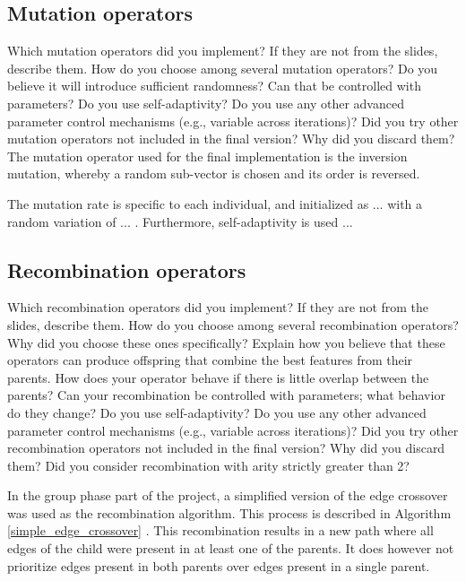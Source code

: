 \documentclass[a4paper,10pt]{article}
\newcommand{\ReplaceMe}[1]{{\color{blue}#1}}
\begin{document}
\subsection{Mutation operators}
\label{mutation}
\ReplaceMe{Which mutation operators did you implement? If they are not from the slides, describe them. How do you choose among several mutation operators? Do you believe it will introduce sufficient randomness? Can that be controlled with parameters? Do you use self-adaptivity? Do you use any other advanced parameter control mechanisms (e.g., variable across iterations)? Did you try other mutation operators not included in the final version? Why did you discard them?}
The mutation operator used for the final implementation is the inversion mutation, whereby a random sub-vector is chosen and its order is reversed.

The mutation rate is specific to each individual, and initialized as ... %
with a random variation of ... %
. Furthermore, self-adaptivity is used ... %

\subsection{Recombination operators}
\label{recombination}
\ReplaceMe{Which recombination operators did you implement? If they are not from the slides, describe them. How do you choose among several recombination operators? Why did you choose these ones specifically? Explain how you believe that these operators can produce offspring that combine the best features from their parents. How does your operator behave if there is little overlap between the parents? Can your recombination be controlled with parameters; what behavior do they change? Do you use self-adaptivity? Do you use any other advanced parameter control mechanisms (e.g., variable across iterations)? Did you try other recombination operators not included in the final version? Why did you discard them? Did you consider recombination with arity strictly greater than 2?}

In the group phase part of the project, a simplified version of the edge crossover was used as the recombination algorithm. This process is described in Algorithm \ref{simple_edge_crossover} \cite{initial_implementation_edge_crossover}. This recombination results in a new path where all edges of the child were present in at least one of the parents. It does however not prioritize edges present in both parents over edges present in a single parent.
\end{document}
